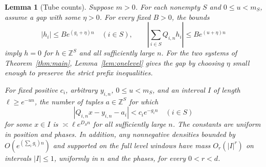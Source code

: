 \documentclass[11pt,a4paper,reqno]{amsart}
\newtheorem{lemma}[theorem]{Lemma}
\theoremstyle{definition}
\theoremstyle{remark}
\numberwithin{equation}{section}
\begin{document}
\begin{lemma}[Tube counts]\label{lem:counts}
Suppose \(m>0\). For each nonempty \(S\) and \(0\le u<m_S\), assume a gap with some \(\eta>0\). For every fixed \(B>0\), the bounds
\[
  |h_i|\le B e^{(g_i+\eta)n}\quad(i\in S),\qquad
  \left|\sum_{i\in S} Q_{i,n}h_i\right|\le B e^{(u+\eta)n}
\]
imply \(h=0\) for \(h\in\mathbb Z^S\) and all sufficiently large \(n\). For the two systems of Theorem~\ref{thm:main}, Lemma~\ref{lem:onelevel} gives the gap by choosing \(\eta\) small enough to preserve the strict prefix inequalities.

For fixed positive \(c_i\), arbitrary \(y_{i,n}\), \(0\le u<m_S\), and an interval \(I\) of length \(\ell\ge e^{-un}\), the number of tuples \(a\in\mathbb Z^S\) for which
\[
    |Q_{i,n}x-y_{i,n}-a_i|<c_i e^{-g_i n}\quad(i\in S)
\]
for some \(x\in I\) is \(\asymp \ell e^{D_S n}\) for all sufficiently large \(n\). The constants are uniform in position and phases. In addition, any nonnegative densities bounded by \(O(e^{(\sum_i g_i)n})\) and supported on the full level windows have mass \(O_r(|I|^r)\) on intervals \(|I|\le1\), uniformly in \(n\) and the phases, for every \(0<r<d\).
\end{lemma}
\end{document}
